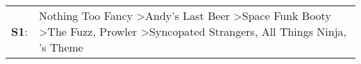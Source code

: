 \begin{supertabular}{p{0.03\textwidth}p{0.92\textwidth}}
 \textbf{S1}:  &  Nothing Too Fancy\textsuperscript{} \textgreater \enspace Andy's Last Beer\textsuperscript{} \textgreater \enspace Space Funk Booty\textsuperscript{} \textgreater \enspace The Fuzz\textsuperscript{}, \enspace Prowler\textsuperscript{} \textgreater \enspace Syncopated Strangers\textsuperscript{}, \enspace All Things Ninja\textsuperscript{}, 's Theme\textsuperscript{}  \enspace  \\
\end{supertabular}
